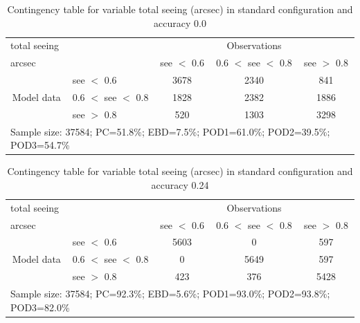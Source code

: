 \documentclass[a4paper,english]{article}
\begin{document}
\newpage

\clearpage
\begin{table}[]
\begin{center}
\begin{tabular}{llccc}
\hline
{total seeing}                                       &                                                    & \multicolumn{3}{c}{Observations}                 \\
{arcsec}                                       &                             & see $<$ 0.6   & 0.6 $<$ see $<$ 0.8 & see $>$ 0.8 \\
\hline
\multicolumn{1}{c}{\multirow{3}{*}{Model data}}  & see $<$ 0.6             & 3678                & 2340                       & 841              \\
                                                 & 0.6  $<$ see $<$ 0.8 & 1828                & 2382                       & 1886              \\
                                                 & see $>$ 0.8             & 520                & 1303                       & 3298              \\
\hline
\multicolumn{5}{l}{Sample size: 37584; PC=51.8\%; EBD=7.5\%; POD1=61.0\%; POD2=39.5\%; POD3=54.7\%}
\end{tabular}
\end{center}
\caption{Contingency table for variable total seeing (arcsec) in standard configuration and accuracy 0.0}
\label{tab:contingencyseeBEF}
\end{table}
\begin{table}[]
\begin{center}
\begin{tabular}{llccc}
\hline
{total seeing}                                       &                                                    & \multicolumn{3}{c}{Observations}                 \\
{arcsec}                                       &                             & see $<$ 0.6   & 0.6 $<$ see $<$ 0.8 & see $>$ 0.8 \\
\hline
\multicolumn{1}{c}{\multirow{3}{*}{Model data}}  & see $<$ 0.6             & 5603                & 0                       & 597              \\
                                                 & 0.6  $<$ see $<$ 0.8 & 0                & 5649                       & 597              \\
                                                 & see $>$ 0.8             & 423                & 376                       & 5428              \\
\hline
\multicolumn{5}{l}{Sample size: 37584; PC=92.3\%; EBD=5.6\%; POD1=93.0\%; POD2=93.8\%; POD3=82.0\%}
\end{tabular}
\end{center}
\caption{Contingency table for variable total seeing (arcsec) in standard configuration and accuracy 0.24}
\label{tab:contingencyseeBEF}
\end{table}
\end{document}
